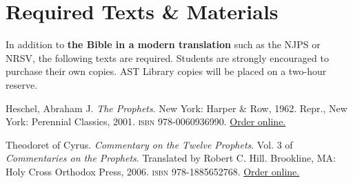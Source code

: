 \documentclass[titlepage]{article}
\newcommand\incl{../includes}
\begin{document}


%

\section{Required Texts \& Materials}
\label{texts}

In addition to \textbf{the Bible in a modern translation} such as the
NJPS or NRSV, the following texts are required. Students are strongly
encouraged to purchase their own copies. AST Library copies will be
placed on a two-hour reserve.

\begingroup
\renewcommand{\section}[2]{}%
\begin{thebibliography}{Theodoret}%

	 Heschel, Abraham J.
	\emph{The Prophets}.
	New York: Harper \& Row, 1962. Repr., New York: Perennial Classics, 2001.
	\textsc{isbn} 978-0060936990. \href{https://amzn.to/46qhye3}{Order online.}

	 Theodoret of Cyrus.
	\emph{Commentary on the Twelve Prophets}. Vol. 3 of \emph{Commentaries on the Prophets}.
	Translated by Robert C. Hill.
	Brookline, MA: Holy Cross Orthodox Press, 2006.
	\textsc{isbn} 978-1885652768. \href{https://amzn.to/47kYajz}{Order online.}




\end{thebibliography}
\endgroup
\end{document}
